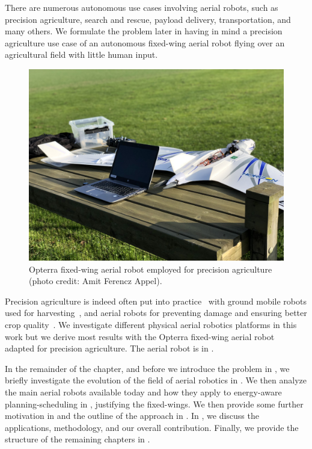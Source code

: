 There are numerous autonomous use cases involving aerial robots, such as precision agriculture, search and rescue, payload delivery, transportation, and many others. We formulate the problem later in  having in mind a precision agriculture use case of an autonomous fixed-wing aerial robot flying over an agricultural field with little human input.
\begin{figure}[t]
  \centering
  \includegraphics[width=.7\textwidth]{pictures/photo}
  \caption[Opterra fixed-wing aerial robot]{Opterra fixed-wing aerial robot employed for precision agriculture {\scriptsize(photo credit: Amit Ferencz Appel)}.}
  \label{fig:opterra}
\end{figure}
Precision agriculture is indeed often put into practice~\citep{hajjaj2014review} with ground mobile robots used for harvesting~\citep{qingchun2012study,dong2011development, de2011design, aljanobi2010setup, li2008analysis, edan2000robotic}, and aerial robots for preventing damage and ensuring better crop quality~\citep{puri2017agriculture, daponte2019review}. We investigate different physical aerial robotics platforms in this work but we derive most results with the Opterra fixed-wing aerial robot~\citep{opterra} adapted for precision agriculture. The aerial robot is in .

In the remainder of the chapter, and before we introduce the problem in , we briefly investigate the evolution of the field of aerial robotics in . We then analyze the main aerial robots available today and how they apply to energy-aware planning-scheduling in , justifying the fixed-wings. We then provide some further motivation in  and the outline of the approach in . In , we discuss the applications, methodology, and our overall contribution. Finally, we provide the structure of the remaining chapters in .

